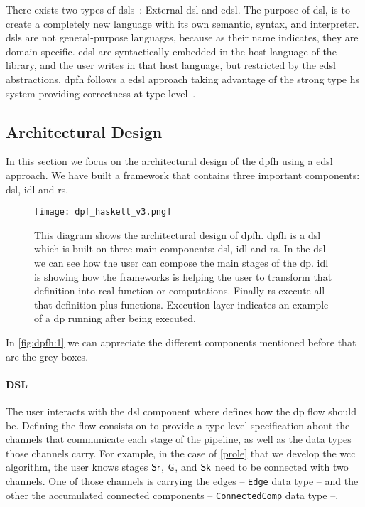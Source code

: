 There exists two types of \acrlong{dsl}s~\cite{dsl}: External \acrfull{dsl} and \acrfull{edsl}. The purpose of \acrshort{dsl}, is to create a completely new language with its own semantic, syntax, and interpreter. 
\acrshort{dsl}s are not general-purpose languages, because as their name indicates, they are domain-specific. \acrshort{edsl} are syntactically embedded in the host language of the library, and the user writes in that host language, but restricted by the \acrshort{edsl} abstractions.
\acrshort{dpfh} follows a \acrshort{edsl} approach taking advantage of the strong type \acrshort{hs} system providing correctness at type-level~\cite{curryhoward}.

\subsection{Architectural Design}
In this section we focus on the architectural design of the \acrshort{dpfh} using a \acrshort{edsl} approach. We have built a framework that contains
three important components: \acrshort{dsl}, \acrshort{idl} and \acrshort{rs}. 

\begin{figure}[!ht]
  \centering
   \texttt{[image: dpf\_haskell\_v3.png]}
    \caption[{[\acrshort{dpfh}] Architectural design of \acrshort{dpfh}}]{This diagram shows the architectural design of \acrshort{dpfh}. \acrshort{dpfh} is a \acrshort{dsl} which is built on three main components: \acrshort{dsl}, \acrshort{idl} and \acrshort{rs}. In the \acrshort{dsl} we can see how the user can compose the main stages of the \acrshort{dp}. \acrshort{idl} is showing how the frameworks is helping the user to transform that definition into real function or computations. Finally \acrshort{rs} execute all that definition plus functions. Execution layer indicates an example of a \acrshort{dp} running after being executed.}
    \label{fig:dpfh:1}
\end{figure}

In \autoref{fig:dpfh:1} we can appreciate the different components mentioned before that are the grey boxes.

\paragraph{DSL} The user interacts with the \acrshort{dsl} component where defines how the \acrshort{dp} flow
should be. Defining the flow consists on to provide a type-level specification about the channels that communicate each stage of the pipeline, as well as the data types those channels carry. 
For example, in the case of \autoref{prole} that we develop the \acrshort{wcc} algorithm, the user knows stages $\mathsf{Sr}$, $\mathsf{G}$, and $\mathsf{Sk}$ need to be connected with two channels. 
One of those channels is carrying the edges -- \texttt{Edge} data type -- and the other the accumulated connected components -- \texttt{ConnectedComp} data type --. 

